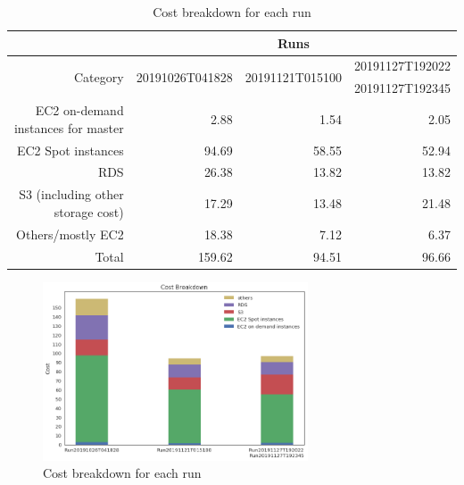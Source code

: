 \begin{table}[h!]
\centering
\begin{tabular} {|r|r|r|r|}
\hline
{}&\multicolumn{3}{c|}{Runs} \\ \hline
\multirow{2}{*}{Category}&\multirow{2}{*}{20191026T041828}&\multirow{2}{*}{20191121T015100}&{20191127T192022}\\
&&&{20191127T192345}\\ \hline
{EC2 on-demand instances for master}& 2.88 &1.54 &2.05\\
{EC2 Spot instances}&94.69&58.55 &52.94\\
{RDS}&26.38&13.82 & 13.82\\
{S3 (including other storage cost)}&17.29&13.48& 21.48\\
{Others/mostly EC2}&18.38 &7.12 &6.37\\ \hline
{Total}&159.62&94.51&96.66\\ \hline
\end{tabular} \normalsize
\caption{Cost breakdown for each run}
\label{tab:billBreakdown}
\end{table}

\begin{figure}[h]
\centering
\includegraphics[width=0.7\textwidth]{figures/billBreakdown.png}
\caption{Cost breakdown for each run}
\label{fig:billBreakdown}
\end{figure}
